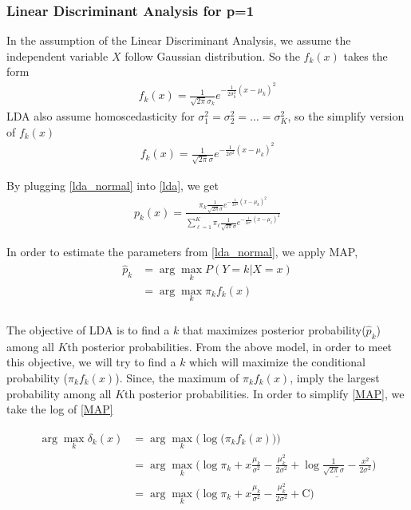 \documentclass[12pt,a4paper]{article}%
\theoremstyle{definition}
\theoremstyle{plain}
\numberwithin{equation}{section}
\begin{document}
\subsubsection{\textbf{Linear Discriminant Analysis for p=1}}
In the assumption of the Linear Discriminant Analysis, we assume the independent variable $X$ follow Gaussian distribution.
So the $f_{k}(x)$ takes the form
\begin{gather}
f_{k}(x) = \frac{1}{\sqrt{2\pi}\sigma_{k}}e^{-\frac{1}{2\sigma_{k}^{2}}(x-\mu_{k})^{2}}
\end{gather}
LDA also assume homoscedasticity for $\sigma_{1}^{2}=\sigma_{2}^{2}=\dots=\sigma_{K}^{2}$, so the simplify version of $f_{k}(x)$
\begin{gather}
f_{k}(x) = \frac{1}{\sqrt{2\pi}\sigma}e^{-\frac{1}{2\sigma^{2}}(x-\mu_{k})^{2}}
\label{lda_normal}
\end{gather}

By plugging \eqref{lda_normal} into \eqref{lda}, we get
\begin{gather}
p_{k}(x) = \frac{\pi_{k} \frac{1}{\sqrt{2\pi}\sigma}e^{-\frac{1}{2\sigma^{2}}(x-\mu_{k})^{2}}}{\sum\limits_{\ell=1}^{K}\pi_{\ell} \frac{1}{\sqrt{2\pi}\sigma}e^{-\frac{1}{2\sigma^{2}}(x-\mu_{\ell})^{2}}}
\end{gather}

In order to estimate the parameters from \eqref{lda_normal}, we apply MAP,
\begin{align}
\begin{split}
\hat{p}_{k} &= \arg\max_{k} P(Y=k|X=x) \\
		    &= \arg\max_{k} \pi_{k}f_{k}(x)\\
\end{split}
\label{MAP}
\end{align}

The objective of LDA is to find a $k$ that maximizes posterior probability($\hat{p}_{k}$) among all $K$th posterior probabilities. 
From the above model, in order to meet this objective, we will try to find a $k$ which will maximize the conditional probability ($\pi_{k}f_{k}(x)$).
Since, the maximum of $\pi_{k}f_{k}(x)$, imply the largest probability among all $K$th posterior probabilities.
In order to simplify \eqref{MAP}, we take the log of \eqref{MAP}

\begin{align}
\begin{split}
\arg\max_{k}  \delta_{k}(x) &= \arg\max_{k} \bigg( \log \big(\pi_{k}f_{k}(x)\big)\bigg) \\
							&= \arg\max_{k} \bigg( \log \pi_{k} + x \frac{\mu_{k}}{\sigma^{2}}-\frac{\mu_{k}^{2}}{2\sigma^{2}}+ \underline{\log \frac{1}{\sqrt{2\pi}\sigma}-\frac{x^{2}}{2\sigma^{2}}} \bigg) \\
							&= \arg\max_{k} \bigg( \log \pi_{k} + x \frac{\mu_{k}}{\sigma^{2}}-\frac{\mu_{k}^{2}}{2\sigma^{2}}+ \text{C} \bigg) \\
\end{split}
\end{align}
\end{document}
